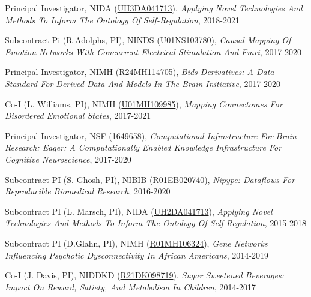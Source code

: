 \documentclass[10pt, letterpaper]{article}
\begin{document}
Principal Investigator, NIDA (\href{http://projectreporter.nih.gov/project_info_description.cfm?aid=9780476}{UH3DA041713}), \textit{Applying Novel Technologies And Methods To Inform The Ontology Of Self-Regulation}, 2018-2021 \vspace{2mm}

Subcontract Pi (R Adolphs, PI), NINDS (\href{http://projectreporter.nih.gov/project_info_description.cfm?aid=9830084}{U01NS103780}), \textit{Causal Mapping Of Emotion Networks With Concurrent Electrical Stimulation And Fmri}, 2017-2020 \vspace{2mm}

Principal Investigator, NIMH (\href{http://projectreporter.nih.gov/project_info_description.cfm?aid=9566304}{R24MH114705}), \textit{Bids-Derivatives: A Data Standard For Derived Data And Models In The Brain Initiative}, 2017-2020 \vspace{2mm}

Co-I (L. Williams, PI), NIMH (\href{https://projectreporter.nih.gov/project_info_description.cfm?aid=9925811}{U01MH109985}), \textit{Mapping Connectomes For Disordered Emotional States}, 2017-2021 \vspace{2mm}

Principal Investigator, NSF (\href{http://www.nsf.gov/awardsearch/showAward?AWD_ID=1649658&HistoricalAwards=false}{1649658}), \textit{Computational Infrastructure For Brain Research: Eager: A Computationally Enabled Knowledge Infrastructure For Cognitive Neuroscience}, 2017-2020 \vspace{2mm}

Subcontract PI (S. Ghosh, PI), NIBIB (\href{https://projectreporter.nih.gov/project_info_description.cfm?aid=9603723}{R01EB020740}), \textit{Nipype: Dataflows For Reproducible Biomedical Research}, 2016-2020 \vspace{2mm}

Subcontract PI (L. Marsch, PI), NIDA (\href{http://projectreporter.nih.gov/project_info_description.cfm?aid=9310428}{UH2DA041713}), \textit{Applying Novel Technologies And Methods To Inform The Ontology Of Self-Regulation}, 2015-2018 \vspace{2mm}

Subcontract PI (D.Glahn, PI), NIMH (\href{http://projectreporter.nih.gov/project_info_description.cfm?aid=9634110}{R01MH106324}), \textit{Gene Networks Influencing Psychotic Dysconnectivity In African Americans}, 2014-2019 \vspace{2mm}

Co-I (J. Davis, PI), NIDDKD (\href{http://projectreporter.nih.gov/project_info_description.cfm?aid=8829825}{R21DK098719}), \textit{Sugar Sweetened Beverages: Impact On Reward, Satiety, And Metabolism In Children}, 2014-2017 \vspace{2mm}
\end{document}
